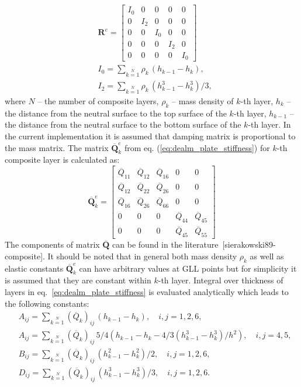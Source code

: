 \documentclass[preprint,12pt]{elsarticle}
\renewcommand{\bm}[1]{\mathbf{#1}}
\begin{document}
	\begin{equation}
	\begin{split}
	&\bm{R}^e = \left[\begin{array}{ccccc} I_0 & 0&0&0&0 \\ 0& I_2&0&0&0 \\0&0&I_0&0&0\\0&0&0&I_2&0\\ 0&0&0&0&I_0 \end{array}\right]\\
	&I_0 =  \sum \limits_{k=1}\limits^{N} \rho_k \,(h_{k-1} - h_k),\\ 
	& I_2 =  \sum \limits_{k=1}\limits^{N} \rho_k \,(h_{k-1}^3 - h_k^3)/3,
	\label{eq:delam_plate_mass_dens}
	\end{split}
	\end{equation}
	where $N$ -- the number of composite layers, $\rho_k$ -- mass density of $k$-th layer, $h_k$ -- the distance from the neutral surface to the top surface of the $k$-th layer, $h_{k-1}$ -- the distance from the neutral surface to the bottom surface of the $k$-th layer.
	In the current implementation it is assumed that damping matrix is proportional to the mass matrix.
	The matrix $\bm{\overline Q}_k^e$ from eq. (\ref{eq:dealm_plate_stiffness}) for $k$-th composite layer is calculated as:
	\begin{equation}
	\bm{\overline Q}_k^e = \left[\begin{array}{ccccc} \overline{Q}_{11} & \overline{Q}_{12}& \overline{Q}_{16} & 0&0\\[2pt]
	\overline{Q}_{12}& \overline{Q}_{22} & \overline{Q}_{26}& 0&0\\\overline{Q}_{16}&\overline{Q}_{26}&\overline{Q}_{66}&0&0\\[2pt]
	0& 0 &0&\overline{Q}_{44}& \overline{Q}_{45}\\[2pt]
	0&0&0&\overline{Q}_{45}&\overline{Q}_{55}\end{array}\right] \label{eq:dealm_plate_stf}
	\end{equation}
	The components of matrix $\bm{\overline Q}$ can be found in the literature~[{sierakowski89-composite}].
	It should be noted that in general both mass density $\rho_k$ as well as elastic constants $\bm{\overline Q}_k^e$ can have arbitrary values at GLL points but for simplicity it is assumed that they are constant within $k$-th layer. Integral over thickness of layers in eq.~\ref{eq:dealm_plate_stiffness} is evaluated analytically which leads to the following constants:
	\begin{equation}
	\begin{split}
	& A_{ij} =  \sum \limits_{k=1}\limits^{N} (\overline{Q}_k)_{ij} \,(h_{k-1} - h_k),\quad i,j = 1,2,6,\\
	& A_{ij} =  \sum \limits_{k=1}\limits^{N} (\overline{Q}_k)_{ij} \,5/4 (h_{k-1} - h_k - 4/3 (h_{k-1}^3 - h_k^3)/h^2 ),\quad i,j = 4,5,\\
	& B_{ij} = \sum \limits_{k=1}\limits^{N}(\overline{Q}_k)_{ij} \,(h_{k-1}^2 - h_k^2)/2, \quad i,j = 1,2,6,\\
	& D_{ij} = \sum \limits_{k=1}\limits^{N}(\overline{Q}_k)_{ij} \,(h_{k-1}^3 - h_k^3)/3, \quad i,j = 1,2,6.
	\end{split}
	\end{equation}
\end{document}
